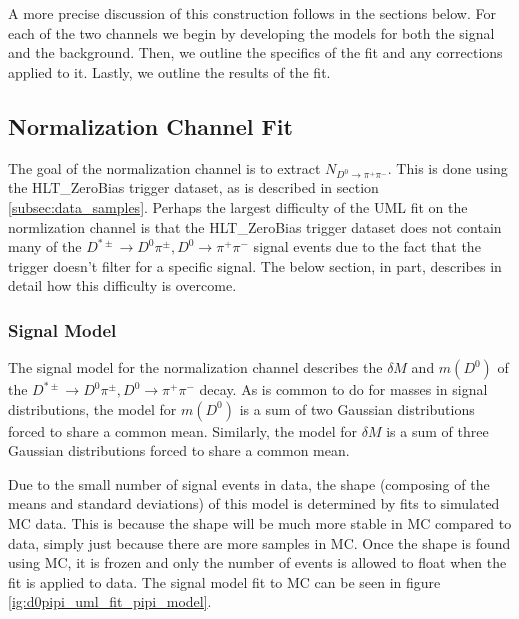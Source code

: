 A more precise discussion of this construction follows in the sections below. For each of the two channels we begin by developing the models for both the signal and the background. Then, we outline the specifics of the fit and any corrections applied to it. Lastly, we outline the results of the fit. 

\subsection{Normalization Channel Fit}

The goal of the normalization channel is to extract $N_{D^0 \to \pi^+ \pi^-}$. This is done using the HLT\_ZeroBias trigger dataset, as is described in section \ref{subsec:data_samples}. Perhaps the largest difficulty of the UML fit on the normlization channel is that the HLT\_ZeroBias trigger dataset does not contain many of the $D^{*\pm}\to D^0 \pi^\pm, D^0 \to \pi^+ \pi^-$ signal events due to the fact that the trigger doesn't filter for a specific signal. The below section, in part, describes in detail how this difficulty is overcome. %

\subsubsection{Signal Model}

The signal model for the normalization channel describes the $\delta M$ and $m(D^0)$ of the $D^{*\pm}\to D^0 \pi^\pm, D^0 \to \pi^+ \pi^-$ decay. As is common to do for masses in signal distributions, the model for $m(D^0)$ is a sum of two Gaussian distributions forced to share a common mean. Similarly, the model for $\delta M$ is a sum of three Gaussian distributions forced to share a common mean.

Due to the small number of signal events in data, the shape (composing of the means and standard deviations) of this model is determined by fits to simulated MC data. This is because the shape will be much more stable in MC compared to data, simply just because there are more samples in MC. Once the shape is found using MC, it is frozen and only the number of events is allowed to float when the fit is applied to data. The signal model fit to MC can be seen in figure \ref{ig:d0pipi_uml_fit_pipi_model}.

